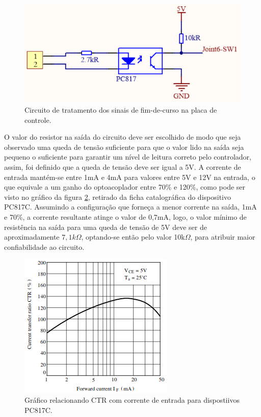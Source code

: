 \begin{figure}[h]
    \caption{Circuito de tratamento dos sinais de fim-de-curso na placa de controle.}    
    \begin{centering}

        \includegraphics[width=0.65\columnwidth]{images/pcbs/MainPCB-Opto.png}
    
    \par\end{centering}

    \label{fig:MainPCB-Optoacopladores}
\end{figure}

O valor do resistor na saída do circuito deve ser 
escolhido de modo que seja observado uma queda de tensão suficiente 
para que o valor lido na saída seja pequeno o suficiente para garantir
um nível de leitura correto pelo controlador, assim, foi definido que a 
queda de tensão deve ser igual a 5V. A corrente de entrada mantém-se 
entre 1mA e 4mA para valores entre 5V e 12V na entrada, o que equivale
a um ganho do optoacoplador entre 70\% e 120\%, como pode ser visto no 
gráfico da figura \ref{fig:opto-CTR}, retirado da ficha catalográfica do 
dispositivo PC817C. 
Assumindo a configuração que forneça a menor corrente na saída, 1mA e 70\%, a corrente resultante
atinge o valor de 0,7mA, logo, o valor mínimo de resistência na saída 
para uma queda de tensão de 5V deve ser de aproximadamente $7,1k\Omega$, optando-se então pelo valor 10k$\Omega$,
para atribuir maior confiabilidade ao circuito.

\begin{figure}[h]
    \caption{Gráfico relacionando CTR com corrente de entrada para dispostiivos PC817C.}    
    \begin{centering}

        \includegraphics[width=0.5\columnwidth]{images/pcbs/opto-CTR.png}
    
    \par\end{centering}

    \label{fig:opto-CTR}
\end{figure}


